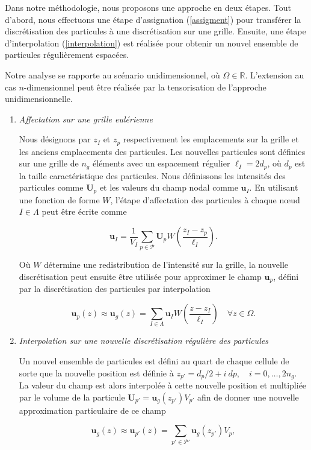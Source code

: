 Dans notre méthodologie, nous proposons une approche en deux étapes. Tout d'abord, nous effectuons une étape d'assignation (\ref{assigment}) pour transférer la discrétisation des particules à une discrétisation sur une grille. Ensuite, une étape d'interpolation (\ref{interpolation}) est réalisée pour obtenir un nouvel ensemble de particules régulièrement espacées.

Notre analyse se rapporte au scénario unidimensionnel, où $\Omega \in \mathbb{R}$. L'extension au cas $n$-dimensionnel peut être réalisée par la tensorisation de l'approche unidimensionnelle.

\begin{enumerate}[label=(\alph*)]
    \item \textit{Affectation sur une grille eulérienne} \label{assigment}

          Nous désignons par $z_{I}$ et $z_{p}$ respectivement les emplacements sur la grille et les anciens emplacements des particules. Les nouvelles particules sont définies sur une grille de $n_g$ éléments avec un espacement régulier $\ell_I = 2 d_p$, où $d_p$ est la taille caractéristique des particules. Nous définissons les intensités des particules comme $\bm U_p$ et les valeurs du champ nodal comme $\bm u_I$. En utilisant une fonction de forme $W$, l'étape d'affectation des particules à chaque nœud $I \in \Lambda$ peut être écrite comme

          \[
              \bm{u}_I = \frac{1}{V_I} \sum_{p \in \mathcal{P}} \bm U_p  W \left(\frac{z_I - z_p}{\ell_I} \right).
          \]

          Où $W$ détermine une redistribution de l'intensité sur la grille, la nouvelle discrétisation peut ensuite être utilisée pour approximer le champ $\bm{u}_p$, défini par la discrétisation des particules par interpolation

          \[
              \bm{u}_p(z) \approx \bm{u}_g(z) = \sum_{I \in \Lambda} \bm u_I W \left(\frac{z - z_I}{\ell_I} \right) \quad \forall z \in \Omega.
          \]

    \item \textit{Interpolation sur une nouvelle discrétisation régulière des particules} \label{interpolation}

          Un nouvel ensemble de particules est défini au quart de chaque cellule de sorte que la nouvelle position est définie à $z_{p'} = d_p/2 + i~dp, \quad i = 0,\dots, 2n_g $. La valeur du champ est alors interpolée à cette nouvelle position et multipliée par le volume de la particule $\bm{U}_{p'} = \bm  u_g(z_{p'}) V_{p'}$ afin de donner une nouvelle approximation particulaire de ce champ

          \[
              \bm{u}_g(z)  \approx \bm{u}_{p'}(z) = \sum_{p'\in\mathcal{P'}} \bm{u}_g(z_{p'}) V_p,
          \]

\end{enumerate}

